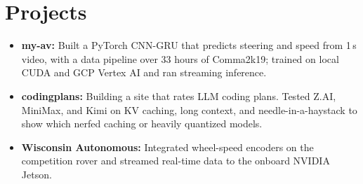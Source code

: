 \documentclass[11pt, letterpaper]{article}
\begin{document}
\section{Projects}
\begin{itemize}
  \item \textbf{my-av:} Built a PyTorch CNN-GRU that predicts steering and speed from 1\,s video, with a data pipeline over 33 hours of Comma2k19; trained on local CUDA and GCP Vertex AI and ran streaming inference.
  \item \textbf{codingplans:} Building a site that rates LLM coding plans. Tested Z.AI, MiniMax, and Kimi on KV caching, long context, and needle-in-a-haystack to show which nerfed caching or heavily quantized models.
  \item \textbf{Wisconsin Autonomous:} Integrated wheel-speed encoders on the competition rover and streamed real-time data to the onboard NVIDIA Jetson.
\end{itemize}
\end{document}
